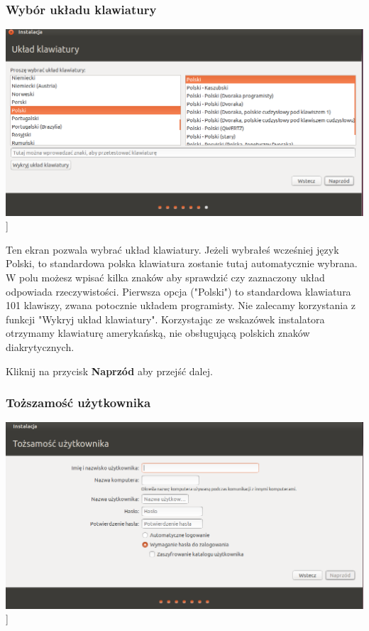 \subsubsection{Wybór układu klawiatury}
\begin{center}
        \includegraphics[scale=0.5]{images/instalator_klawiatura.png}]
\end{center}

Ten ekran pozwala wybrać układ klawiatury. Jeżeli wybrałeś wcześniej język Polski, to standardowa polska klawiatura zostanie tutaj automatycznie wybrana. W polu możesz wpisać kilka znaków aby sprawdzić czy zaznaczony układ odpowiada rzeczywistości. Pierwsza opcja ("Polski") to standardowa klawiatura 101 klawiszy, zwana potocznie układem programisty.
Nie zalecamy korzystania z funkcji "Wykryj układ klawiatury". Korzystając ze wskazówek instalatora otrzymamy klawiaturę amerykańską, nie obsługującą polskich znaków diakrytycznych.
\begin{flushright}
Kliknij na przycisk \textbf{Naprzód} aby przejść dalej.
\end{flushright}
\clearpage
\subsubsection{Toższamość użytkownika}
\begin{center}
        \includegraphics[scale=0.5]{images/instalator_dane.png}]
\end{center}

